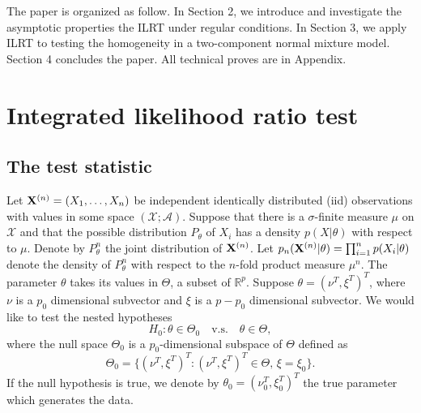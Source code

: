 \documentclass[11pt]{article}
\theoremstyle{plain}
\theoremstyle{definition}
\theoremstyle{remark}
\begin{document}
The paper is organized as follow.
In Section 2, we introduce and investigate the asymptotic properties the ILRT under regular conditions.
In Section 3, we apply ILRT to testing the homogeneity in a two-component normal mixture model.
Section 4 concludes the paper.
All technical proves are in Appendix.





\section{Integrated likelihood ratio test}

\subsection{The test statistic}

Let $\mathbf{X}^{(n)}=(X_1,\ldots,X_n)$ be independent identically distributed (iid) observations with values in some space $(\mathcal{X};\mathscr{A})$.
Suppose that there is a $\sigma$-finite measure $\mu$ on $\mathcal{X}$ and that the  possible distribution $P_\theta$ of $X_i$ has a density $p(X|\theta)$ with respect to $\mu$.
Denote by $P_{\theta}^{n}$ the joint distribution of $\mathbf{X}^{(n)}$.
Let $p_{n}(\mathbf{X}^{(n)}|\theta)=\prod_{i=1}^n p(X_i|\theta)$ denote the density of $P_{\theta}^n$ with respect to the $n$-fold product measure $\mu^n$.
The parameter $\theta$ takes its values in $\Theta$, a subset of $\mathbb{R}^{p}$.
Suppose $\theta=(\nu^T,\xi^T)^T$, where $\nu$ is a $p_0$ dimensional subvector and $\xi$ is a $p-p_0$ dimensional subvector.
 We would like to test the nested hypotheses
\begin{equation*}
    H_0:\theta\in\Theta_0\quad \text{v.s.}\quad \theta\in\Theta,
\end{equation*}
where the null space $\Theta_0$ is a $p_0$-dimensional subspace of $\Theta$ defined as
\begin{equation*}
    \Theta_0=\{(\nu^T,\xi^T)^T:(\nu^T,\xi^T)^T\in\Theta, \, \xi=\xi_0\}.
\end{equation*}
If the null hypothesis is true, we denote by $\theta_0=(\nu_0^T,\xi_0^T)^T$ the true parameter which generates the data.
\end{document}
